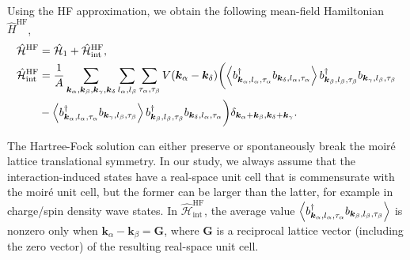 \documentclass[aps,prl,onecolumn,superscriptaddress,longbibliography]{revtex4-2}
\begin{document}
Using the HF approximation, we obtain the following mean-field Hamiltonian $\hat{H}^{\text{HF}}$,
\begin{equation}\label{eq:HF}
    \begin{aligned}
    \hat{\mathcal{H}}^{\text{HF}}&=\hat{\mathcal{H}}_1 +\hat{\mathcal{H}}_{\text{int}}^{\text{HF}},\\
    \hat{\mathcal{H}}_{\text{int}}^{\text{HF}}&=\frac{1}{A} \sum_{\bm{k}_{\alpha},\bm{k}_{\beta},\bm{k}_{\gamma},\bm{k}_{\delta}  }\sum_{l_{\alpha},l_{\beta}}\sum_{\tau_{\alpha},\tau_{\beta}} V(\bm{k}_{\alpha}-\bm{k}_{\delta})\biggl( \expval{b_{\bm{k}_{\alpha},l_{\alpha},\tau_{\alpha}}^\dagger b_{\bm{k}_{\delta},l_{\alpha},\tau_{\alpha}}} b_{\bm{k}_{\beta},l_{\beta},\tau_{\beta}}^\dagger b_{\bm{k}_{\gamma},l_{\beta},\tau_{\beta}}\\
        &-\expval{b_{\bm{k}_{\alpha},l_{\alpha},\tau_{\alpha}}^\dagger b_{\bm{k}_{\gamma},l_{\beta},\tau_{\beta}} }b_{\bm{k}_{\beta},l_{\beta},\tau_{\beta}}^\dagger b_{\bm{k}_{\delta},l_{\alpha},\tau_{\alpha}}\biggr) \delta_{\bm{k}_{\alpha}+\bm{k}_{\beta}, \bm{k}_{\delta}+\bm{k}_{\gamma}}.
    \end{aligned}
\end{equation}

{The Hartree-Fock solution can either preserve or spontaneously break the moir\'e lattice translational symmetry.} In our study, we always assume that the interaction-induced states have a real-space unit cell that is commensurate with the moir\'e unit cell, but the former can be larger than the latter, for example in charge/spin density wave states. In $\hat{\mathcal{H}}_{\text{int}}^{\text{HF}}$, the average value $\expval{ b_{\bm{k}_{\alpha},l_{\alpha},\tau_{\alpha}}^\dagger b_{\bm{k}_{\beta},l_{\beta},\tau_{\beta}}}$ is nonzero only when $\bm{k}_{\alpha}-\bm{k}_{\beta}=\bm{G}$, where $\bm{G}$ is a  reciprocal lattice vector (including the zero vector) of the resulting real-space unit cell. 
\end{document}
